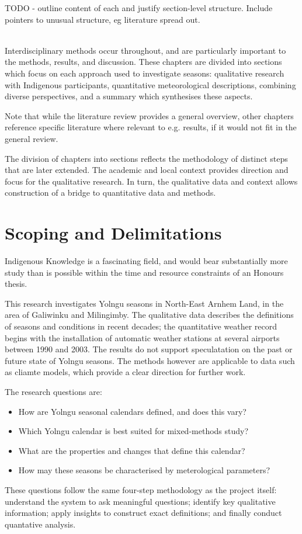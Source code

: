 TODO - outline content of each and justify section-level structure.
Include pointers to unusual structure, eg literature spread out.

~\\

Interdisciplinary methods occur throughout, and are particularly important
to the methods, results, and discussion.  These chapters are divided into
sections which focus on each approach used to investigate seasons:
qualitative research with Indigenous participants,
quantitative meteorological descriptions,
combining diverse perspectives, and
a summary which synthesises these aspects.

Note that while the literature review provides a general overview,
other chapters reference specific literature where relevant to e.g.
results, if it would not fit in the general review.

The division of chapters into sections
reflects the methodology of distinct steps that are
later extended.  The academic and local context provides direction and focus
for the qualitative research.  In turn, the qualitative data and context
allows construction of a bridge to quantitative data and methods.



\section{Scoping and Delimitations}
Indigenous Knowledge is a fascinating field, and would bear substantially
more study than is possible within the time and resource constraints of
an Honours thesis.

This research investigates Yolngu seasons in North-East Arnhem Land, in
the area of Galiwinku and Milingimby.  The qualitative data describes the
definitions of seasons and conditions in recent decades; the quantitative
weather record begins with the installation of automatic weather stations
at several airports between 1990 and 2003.  The results do not support
speculatation on the past or future state of Yolngu seasons.  The methods
however are applicable to data such as cliamte models, which provide
a clear direction for further work.

The research questions are:
\begin{itemize}
\item How are Yolngu seasonal calendars defined, and does this vary?
\item Which Yolngu calendar is best suited for mixed-methods study?
\item What are the properties and changes that define this calendar?
\item How may these seasons be characterised by meterological parameters?
\end{itemize}
These questions follow the same four-step methodology as the project itself:
understand the system to ask meaningful questions; identify key
qualitative information; apply insights to construct exact definitions; and
finally conduct quantative analysis.


